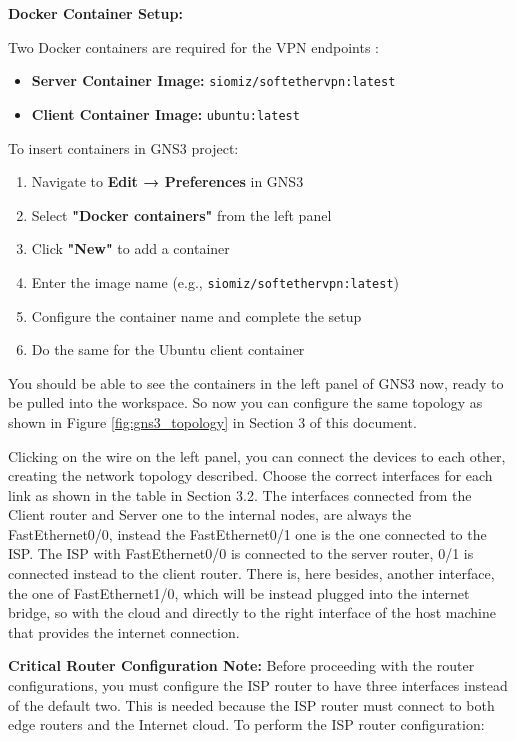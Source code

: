 \noindent
\textbf{Docker Container Setup:}

\noindent
Two Docker containers are required for the VPN endpoints \cite{docker_official}:

\begin{itemize}
    \item \textbf{Server Container Image:} \texttt{siomiz/softethervpn:latest} \cite{siomiz_softether}
    \item \textbf{Client Container Image:} \texttt{ubuntu:latest} \cite{ubuntu_docker}
\end{itemize}

\noindent
To insert containers in GNS3 project:

\begin{enumerate}
    \item Navigate to \textbf{Edit → Preferences} in GNS3
    \item Select \textbf{"Docker containers"} from the left panel
    \item Click \textbf{"New"} to add a container
    \item Enter the image name (e.g., \texttt{siomiz/softethervpn:latest})
    \item Configure the container name and complete the setup
    \item Do the same for the Ubuntu client container
\end{enumerate}

\noindent
You should be able to see the containers in the left panel of GNS3 now, ready to be pulled into the workspace. So now you can configure the same topology as shown in Figure \ref{fig:gns3_topology} in Section 3 of this document. 

\noindent
Clicking on the wire on the left panel, you can connect the devices to each other, creating the network topology described. Choose the correct interfaces for each link as shown in the table in Section 3.2. The interfaces connected from the Client router and Server one to the internal nodes, are always the FastEthernet0/0, instead the FastEthernet0/1 one is the one connected to the ISP. The ISP with FastEthernet0/0 is connected to the server router, 0/1 is connected instead to the client router. There is, here besides, another interface, the one of FastEthernet1/0, which will be instead plugged into the internet bridge, so with the cloud and directly to the right interface of the host machine that provides the internet connection.

\noindent
\textbf{Critical Router Configuration Note:}
\noindent
Before proceeding with the router configurations, you must configure the ISP router to have three interfaces instead of the default two. This is needed because the ISP router must connect to both edge routers and the Internet cloud. To perform the ISP router configuration:

